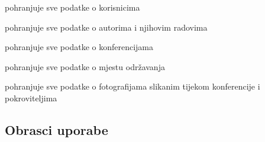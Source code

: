 \begin{packed_enum}
\begin{packed_enum}
				\end{packed_enum}
					
				\item  {}
					
				\begin{packed_enum}
						
					\item pohranjuje sve podatke o korisnicima
					\item pohranjuje sve podatke o autorima i njihovim radovima
					\item pohranjuje sve podatke o konferencijama
					\item pohranjuje sve podatke o mjestu održavanja
					\item pohranjuje sve podatke o fotografijama slikanim tijekom konferencije i pokroviteljima
						
				\end{packed_enum}
				
			\end{packed_enum}
			
			\eject 
			
			
				
			\subsection{Obrasci uporabe}
				
				
				
	
						
	
